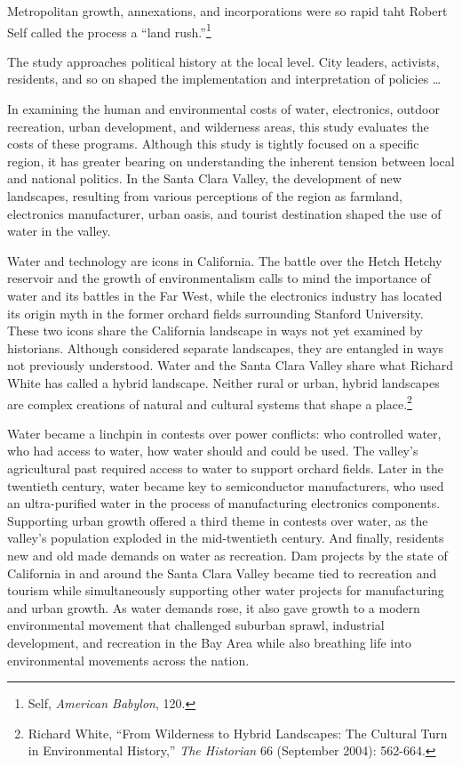 \documentclass[11pt,article,oneside]{memoir}
\begin{document}
Metropolitan growth, annexations, and incorporations were so rapid taht
Robert Self called the process a ``land rush.''\footnote{Self,
  \emph{American Babylon}, 120.}

The study approaches political history at the local level. City leaders,
activists, residents, and so on shaped the implementation and
interpretation of policies \ldots{}

In examining the human and environmental costs of water, electronics,
outdoor recreation, urban development, and wilderness areas, this study
evaluates the costs of these programs. Although this study is tightly
focused on a specific region, it has greater bearing on understanding
the inherent tension between local and national politics. In the Santa
Clara Valley, the development of new landscapes, resulting from various
perceptions of the region as farmland, electronics manufacturer, urban
oasis, and tourist destination shaped the use of water in the valley.

Water and technology are icons in California. The battle over the Hetch
Hetchy reservoir and the growth of environmentalism calls to mind the
importance of water and its battles in the Far West, while the
electronics industry has located its origin myth in the former orchard
fields surrounding Stanford University. These two icons share the
California landscape in ways not yet examined by historians. Although
considered separate landscapes, they are entangled in ways not
previously understood. Water and the Santa Clara Valley share what
Richard White has called a hybrid landscape. Neither rural or urban,
hybrid landscapes are complex creations of natural and cultural systems
that shape a place.⁠\footnote{Richard White, ``From Wilderness to Hybrid
  Landscapes: The Cultural Turn in Environmental History,'' \emph{The
  Historian} 66 (September 2004): 562-664.}

Water became a linchpin in contests over power conflicts: who controlled
water, who had access to water, how water should and could be used. The
valley's agricultural past required access to water to support orchard
fields. Later in the twentieth century, water became key to
semiconductor manufacturers, who used an ultra-purified water in the
process of manufacturing electronics components. Supporting urban growth
offered a third theme in contests over water, as the valley's population
exploded in the mid-twentieth century. And finally, residents new and
old made demands on water as recreation. Dam projects by the state of
California in and around the Santa Clara Valley became tied to
recreation and tourism while simultaneously supporting other water
projects for manufacturing and urban growth. As water demands rose, it
also gave growth to a modern environmental movement that challenged
suburban sprawl, industrial development, and recreation in the Bay Area
while also breathing life into environmental movements across the
nation.
\end{document}
